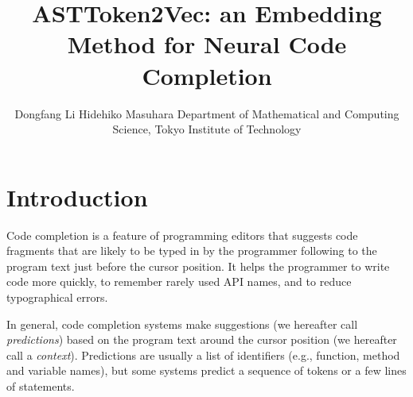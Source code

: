 \documentclass[E]{compsoft}
\begin{document}
\title{ASTToken2Vec: an Embedding Method for Neural Code Completion}

\author{Dongfang Li  \quad   Hidehiko Masuhara
%
%
%
%
%
{Department of Mathematical and Computing Science, Tokyo Institute of Technology}}




\maketitle \thispagestyle {empty}







\section{Introduction}
Code completion is a feature of programming editors that suggests code fragments that are likely to be typed in by the programmer following to the program text just before the cursor position.  It helps the programmer to write code more quickly, to remember rarely used API names, and to reduce typographical errors.

In general, code completion systems make suggestions (we hereafter call \emph{predictions}) based on the program text around the cursor position (we hereafter call a \emph{context}).  Predictions are usually a list of identifiers (e.g., function, method and variable names), but some systems predict a sequence of tokens or a few lines of statements.
\end{document}
